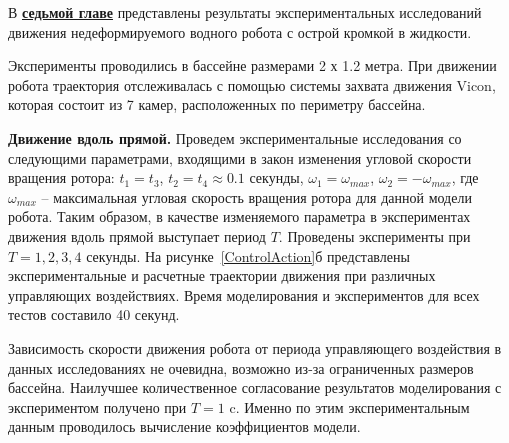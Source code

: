 В \underline{\textbf{седьмой главе}} представлены результаты экспериментальных исследований движения недеформируемого водного робота с острой кромкой в жидкости.

Эксперименты проводились в бассейне размерами 2 х 1.2 метра. При движении робота траектория отслеживалась с помощью системы захвата движения Vicon, которая состоит из 7 камер, расположенных по периметру бассейна.

\textbf{Движение вдоль прямой.} Проведем экспериментальные исследования со следующими параметрами, входящими в закон изменения угловой скорости вращения ротора: $t_1=t_3$, $ t_2 = t_4 \approx 0.1 $ секунды, $ \omega_1 = \omega_{max} $, $ \omega_2 = -\omega_{max} $, где $ \omega_{max} $ -- максимальная угловая скорость вращения ротора для данной модели робота. Таким образом, в качестве изменяемого параметра в экспериментах движения вдоль прямой выступает период $T$. %
Проведены эксперименты при $ T = 1, 2, 3, 4 $ секунды. На рисунке~\ref{ControlAction}б представлены экспериментальные и расчетные траектории движения при различных управляющих воздействиях. 
Время моделирования и экспериментов для всех тестов составило 40 секунд. %

%




Зависимость скорости движения робота от периода управляющего воздействия в данных исследованиях не очевидна, возможно из-за ограниченных размеров бассейна. Наилучшее количественное согласование результатов моделирования с экспериментом получено при $T = 1$ c. Именно по этим экспериментальным данным проводилось вычисление коэффициентов модели. 

